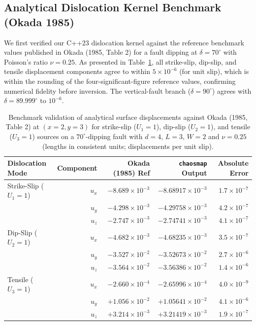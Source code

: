 \documentclass[11pt,a4paper]{article}
\begin{document}
\subsection{Analytical Dislocation Kernel Benchmark (Okada 1985)}
We first verified our C++23 dislocation kernel against the reference benchmark values published in Okada (1985, Table 2) \cite{okada1985} for a fault dipping at $\delta = 70^\circ$ with Poisson's ratio $\nu = 0.25$. As presented in Table~\ref{tab:okada_bench}, all strike-slip, dip-slip, and tensile displacement components agree to within $5\times 10^{-6}$ (for unit slip), which is within the rounding of the four-significant-figure reference values, confirming numerical fidelity before inversion. The vertical-fault branch ($\delta = 90^\circ$) agrees with $\delta = 89.999^\circ$ to $10^{-6}$.

\begin{table}[htbp]
\centering
\caption{Benchmark validation of analytical surface displacements against Okada (1985, Table 2) at $(x=2, y=3)$ for strike-slip ($U_1=1$), dip-slip ($U_2=1$), and tensile ($U_3=1$) sources on a $70^\circ$-dipping fault with $d=4$, $L=3$, $W=2$ and $\nu = 0.25$ (lengths in consistent units; displacements per unit slip).}
\label{tab:okada_bench}
\begin{tabular}{lrrrr}
\toprule
Dislocation Mode & Component & Okada (1985) Ref & \texttt{chaosmap} Output & Absolute Error \\
\midrule
Strike-Slip ($U_1=1$) & $u_x$ & $-8.689 \times 10^{-3}$ & $-8.68917 \times 10^{-3}$ & $1.7 \times 10^{-7}$ \\
                      & $u_y$ & $-4.298 \times 10^{-3}$ & $-4.29758 \times 10^{-3}$ & $4.2 \times 10^{-7}$ \\
                      & $u_z$ & $-2.747 \times 10^{-3}$ & $-2.74741 \times 10^{-3}$ & $4.1 \times 10^{-7}$ \\
\midrule
Dip-Slip ($U_2=1$)    & $u_x$ & $-4.682 \times 10^{-3}$ & $-4.68235 \times 10^{-3}$ & $3.5 \times 10^{-7}$ \\
                      & $u_y$ & $-3.527 \times 10^{-2}$ & $-3.52673 \times 10^{-2}$ & $2.7 \times 10^{-6}$ \\
                      & $u_z$ & $-3.564 \times 10^{-2}$ & $-3.56386 \times 10^{-2}$ & $1.4 \times 10^{-6}$ \\
\midrule
Tensile ($U_3=1$)     & $u_x$ & $-2.660 \times 10^{-4}$ & $-2.65996 \times 10^{-4}$ & $4.0 \times 10^{-9}$ \\
                      & $u_y$ & $+1.056 \times 10^{-2}$ & $+1.05641 \times 10^{-2}$ & $4.1 \times 10^{-6}$ \\
                      & $u_z$ & $+3.214 \times 10^{-3}$ & $+3.21419 \times 10^{-3}$ & $1.9 \times 10^{-7}$ \\
\bottomrule
\end{tabular}
\end{table}
\end{document}
